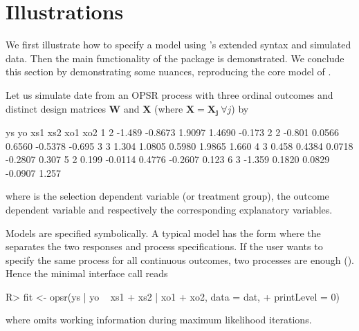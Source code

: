 \documentclass[%
    twoside, openright, titlepage, numbers=noenddot,%
    cleardoublepage=empty,%
    abstract=false,%
    BCOR=5.5mm, paper=a5, fontsize=10pt,%
]{scrreprt}
\begin{document}
\section{Illustrations} \label{sec:illustrations}

We first illustrate how to specify a model using 's extended syntax and simulated data. Then the main functionality of the package is demonstrated. We conclude this section by demonstrating some nuances, reproducing the core model of \cite{Wang+Mokhtarian:2024}.

Let us simulate date from an OPSR process with three ordinal outcomes and distinct design matrices $\boldsymbol{W}$ and $\boldsymbol{X}$ (where $\boldsymbol{X} = \boldsymbol{X_j} \ \forall{j}$) by
%
\begin{Schunk}
\begin{Soutput}
  ys     yo     xs1    xs2     xo1    xo2
1  2 -1.489 -0.8673 1.9097  1.4690 -0.173
2  2 -0.801  0.0566 0.6560 -0.5378 -0.695
3  3  1.304  1.0805 0.5980  1.9865  1.660
4  3  0.458  0.4384 0.0718 -0.2807  0.307
5  2  0.199 -0.0114 0.4776 -0.2607  0.123
6  3 -1.359  0.1820 0.0829 -0.0907  1.257
\end{Soutput}
\end{Schunk}
%
where  is the selection dependent variable (or treatment group),  the outcome dependent variable and  respectively  the corresponding explanatory variables.

Models are specified symbolically. A typical model has the form  where the \code{|} separates the two responses and process specifications. If the user wants to specify the same process for all continuous outcomes, two processes are enough (). Hence the minimal  interface call reads
%
\begin{Schunk}
\begin{Sinput}
R> fit <- opsr(ys | yo ~ xs1 + xs2 | xo1 + xo2, data = dat,
+    printLevel = 0)
\end{Sinput}
\end{Schunk}
%
where  omits working information during maximum likelihood iterations.
\end{document}
